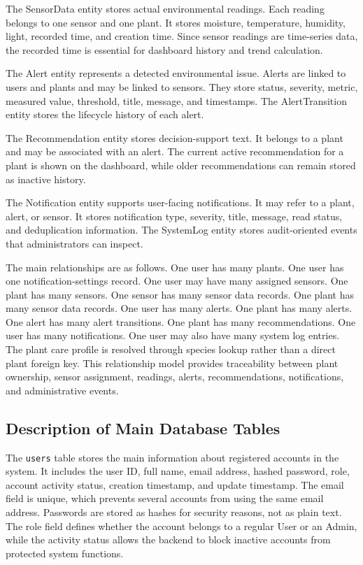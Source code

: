 The SensorData entity stores actual environmental readings. Each reading belongs to one sensor and one plant. It stores moisture, temperature, humidity, light, recorded time, and creation time. Since sensor readings are time-series data, the recorded time is essential for dashboard history and trend calculation.

The Alert entity represents a detected environmental issue. Alerts are linked to users and plants and may be linked to sensors. They store status, severity, metric, measured value, threshold, title, message, and timestamps. The AlertTransition entity stores the lifecycle history of each alert.

The Recommendation entity stores decision-support text. It belongs to a plant and may be associated with an alert. The current active recommendation for a plant is shown on the dashboard, while older recommendations can remain stored as inactive history.

The Notification entity supports user-facing notifications. It may refer to a plant, alert, or sensor. It stores notification type, severity, title, message, read status, and deduplication information. The SystemLog entity stores audit-oriented events that administrators can inspect.

The main relationships are as follows. One user has many plants. One user has one notification-settings record. One user may have many assigned sensors. One plant has many sensors. One sensor has many sensor data records. One plant has many sensor data records. One user has many alerts. One plant has many alerts. One alert has many alert transitions. One plant has many recommendations. One user has many notifications. One user may also have many system log entries. The plant care profile is resolved through species lookup rather than a direct plant foreign key. This relationship model provides traceability between plant ownership, sensor assignment, readings, alerts, recommendations, notifications, and administrative events.

\subsection{Description of Main Database Tables}
\label{subsec:description-main-database-tables}

The \texttt{users} table stores the main information about registered accounts in the system. It includes the user ID, full name, email address, hashed password, role, account activity status, creation timestamp, and update timestamp. The email field is unique, which prevents several accounts from using the same email address. Passwords are stored as hashes for security reasons, not as plain text. The role field defines whether the account belongs to a regular User or an Admin, while the activity status allows the backend to block inactive accounts from protected system functions.

